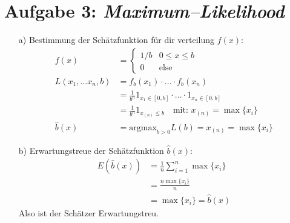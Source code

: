 \section*{Aufgabe 3: \emph{Maximum--Likelihood}}
\begin{itemize}
\item[a)] Bestimmung der Schätzfunktion für dir verteilung $f(x)$:
\begin{align*}
f(x)&=
	\begin{cases}
		1/b & 0 \leq x \leq b\\
		0	&\text{else}
	\end{cases}\\
L(x_1 ,... x_n,b) &= f_b(x_1)\cdot ... \cdot f_b(x_n)\\
&=\frac{1}{b^n} 1_{x_1 \in [0,b]} \cdot ... \cdot 1_{x_n \in [0,b]}\\
&=\frac{1}{b^n} 1_{x_{(n)} \leq b} \quad \text{mit: } x_{(n)} = \max\{x_i\} \\
\hat{b}(x) &= \text{argmax}_{b>0} L(b) = x_{(n)} =  \max\{x_i\} 
\end{align*}
\item[b)] Erwartungstreue der Schätzfunktion $\hat{b}(x)$:
\begin{align*}
E(\hat{b}(x)) &= \frac{1}{n} \sum_{i=1}^n \max\{x_i\}\\ 
&= \frac{n \max\{x_i\}}{n} \\
&= \max\{x_i\} = \hat{b}(x)
\end{align*}
Also ist der Schätzer Erwartungstreu.

\end{itemize}

